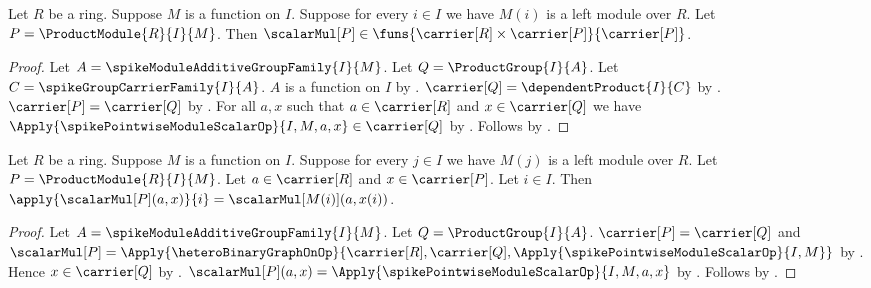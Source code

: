 \begin{proposition}\label{spike_product_module_scalar_type}
    Let $R$ be a ring.
    Suppose $M$ is a function on $I$.
    Suppose for every $i\in I$ we have $M(i)$ is a left module over $R$.
    Let $P=\ProductModule{R}{I}{M}$.
    Then
        $\scalarMul[P]\in
            \funs{\carrier[R]\times\carrier[P]}{\carrier[P]}$.
\end{proposition}
\begin{proof}
    Let $A=\spikeModuleAdditiveGroupFamily{I}{M}$.
    Let $Q=\ProductGroup{I}{A}$.
    Let $C=\spikeGroupCarrierFamily{I}{A}$.
    $A$ is a function on $I$ by
        .
    $\carrier[Q]=\dependentProduct{I}{C}$ by
        .
    $\carrier[P]=\carrier[Q]$ by
        .
    For all $a,x$ such that $a\in\carrier[R]$ and
        $x\in\carrier[Q]$ we have
        $\Apply{\spikePointwiseModuleScalarOp}{I,M,a,x}
            \in\carrier[Q]$ by
        .
    Follows by
        .
\end{proof}

\begin{proposition}\label{spike_product_module_scalar_coordinate}
    Let $R$ be a ring.
    Suppose $M$ is a function on $I$.
    Suppose for every $j\in I$ we have $M(j)$ is a left module over $R$.
    Let $P=\ProductModule{R}{I}{M}$.
    Let $a\in\carrier[R]$ and $x\in\carrier[P]$.
    Let $i\in I$.
    Then
        $\apply{\scalarMul[P](a,x)}{i}
            =\scalarMul[M(i)](a,x(i))$.
\end{proposition}
\begin{proof}
    Let $A=\spikeModuleAdditiveGroupFamily{I}{M}$.
    Let $Q=\ProductGroup{I}{A}$.
    $\carrier[P]=\carrier[Q]$ and
        $\scalarMul[P]=\Apply{\heteroBinaryGraphOnOp}{
            \carrier[R],\carrier[Q],
            \Apply{\spikePointwiseModuleScalarOp}{I,M}}$ by
        .
    Hence $x\in\carrier[Q]$ by \auto.
    $\scalarMul[P](a,x)
        =\Apply{\spikePointwiseModuleScalarOp}{I,M,a,x}$ by
        .
    Follows by
        .
\end{proof}

